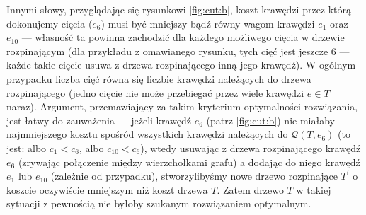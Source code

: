 Innymi słowy, przyglądając się rysunkowi \ref{fig:cut:b}, koszt krawędzi przez którą dokonujemy cięcia ($e_{6}$) musi być mniejszy bądź równy wagom krawędzi $e_{1}$ oraz $e_{10}$ --- własność ta powinna zachodzić dla każdego możliwego cięcia w drzewie rozpinającym (dla przykładu z omawianego rysunku, tych cięć jest jeszcze $6$ --- każde takie cięcie usuwa z drzewa rozpinającego inną jego krawędź). W ogólnym przypadku liczba cięć równa się liczbie krawędzi należących do drzewa rozpinającego (jedno cięcie nie może przebiegać przez wiele krawędzi $e \in T$ naraz). Argument, przemawiający za takim kryterium optymalności rozwiązania, jest łatwy do zauważenia --- jeżeli krawędź $e_{6}$ (patrz \ref{fig:cut:b}) nie miałaby najmniejszego kosztu spośród wszystkich krawędzi należących do $\mathcal{Q} \left( T, e_{6} \right)$ (to jest: albo $c_{1} < c_{6}$, albo $c_{10} < c_{6}$), wtedy usuwając z drzewa rozpinającego krawędź $e_{6}$ (zrywając połączenie między wierzchołkami grafu) a dodając do niego krawędź $e_{1}$ lub $e_{10}$ (zależnie od przypadku), stworzylibyśmy nowe drzewo rozpinające $T^{\prime}$ o koszcie oczywiście mniejszym niż koszt drzewa $T$. Zatem drzewo $T$ w takiej sytuacji z pewnością nie byłoby szukanym rozwiązaniem optymalnym.
\\
